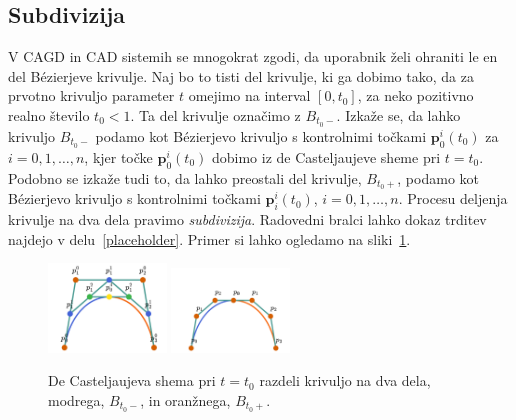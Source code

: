 \documentclass[isrm2, tisk]{fmfdelo}
\newcommand{\p}{\mathbf{p}}
\newcommand{\groupimagewidth}{0.28\textwidth}
\begin{document}
    \subsection{Subdivizija}
    V CAGD in CAD sistemih se mnogokrat zgodi, da uporabnik želi ohraniti le en del Bézierjeve krivulje.
    Naj bo to tisti del krivulje, ki ga dobimo tako, da za prvotno krivuljo parameter $t$ omejimo na interval $[0,t_0]$, za neko pozitivno realno število $t_0<1$.
    Ta del krivulje označimo z $B_{t_0-}$.
    Izkaže se, da lahko krivuljo $B_{t_0-}$ podamo kot Bézierjevo krivuljo s kontrolnimi točkami $\p_0^i(t_0)$ za $i=0,1,\ldots,n$, kjer točke $\p_0^i(t_0)$ dobimo iz de Casteljaujeve sheme pri $t=t_0$.
    Podobno se izkaže tudi to, da lahko preostali del krivulje, $B_{t_0+}$, podamo kot Bézierjevo krivuljo s kontrolnimi točkami $\p_i^i(t_0)$,  $i=0,1,\ldots,n$.
    Procesu deljenja krivulje na dva dela pravimo \textit{subdivizija}.
    Radovedni bralci lahko dokaz trditev najdejo v delu~\ref{placeholder}.
    Primer si lahko ogledamo na sliki~\ref{fig:subdivizija}.
    \begin{figure}[h]
        \centering
        \includegraphics[width=\groupimagewidth]{images/subdivizija}
        \qquad
        \includegraphics[width=\groupimagewidth]{images/subdivision-split}
        \caption{De Casteljaujeva shema pri $t=t_0$ razdeli krivuljo na dva dela, modrega, $B_{t_0-}$, in oranžnega, $B_{t_0+}$. }
        \label{fig:subdivizija}
    \end{figure}
\end{document}
